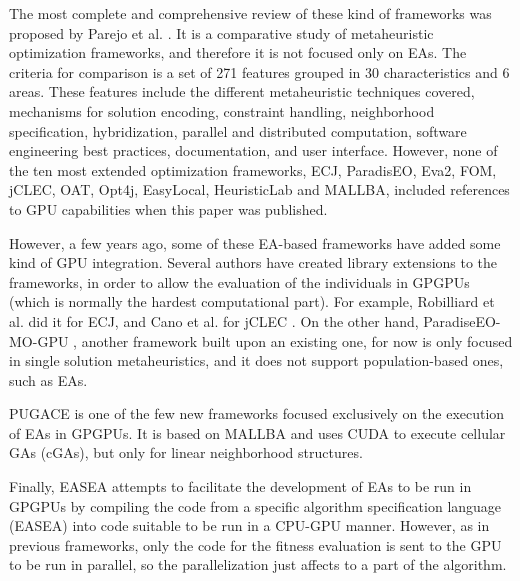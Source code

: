 \documentclass{article}
\begin{document}
The most complete and comprehensive review of these kind of frameworks was proposed by Parejo et al. \cite{springerlink:10.1007/s00500-011-0754-8}. It is a comparative study of metaheuristic optimization frameworks, and therefore it is not focused only on EAs. The criteria for comparison is a set of 271 features grouped in 30 characteristics and 6 areas. These features include the different metaheuristic techniques covered, mechanisms for solution encoding, constraint handling, neighborhood specification, hybridization, parallel and distributed computation, software engineering best practices, documentation, and user interface. However, none of the ten most extended optimization frameworks, ECJ, ParadisEO, Eva2, FOM, jCLEC, OAT, Opt4j, EasyLocal, HeuristicLab and MALLBA, included references to GPU capabilities when this paper was published.

However, a few years ago, some of these EA-based frameworks have added some
kind of GPU integration. Several authors have created library
extensions to the frameworks, in order to allow the evaluation of the
individuals in GPGPUs (which is normally the hardest computational
part). For example, Robilliard et al. \cite{RobilliardECJGPU08} did it
for ECJ, and Cano et al. for jCLEC
\cite{SpeedingTheEvaluationofGPCano:2012}.  
On the other hand, ParadiseEO-MO-GPU \cite{MealbParadiseoGPU13}, another framework built upon an existing one, for now is only focused in single solution metaheuristics, and it does not support population-based ones, such as EAs. 


PUGACE \cite{5586286} is one of the few new frameworks focused exclusively on the execution of EAs in GPGPUs. It is based on MALLBA and uses CUDA to execute cellular GAs (cGAs), but only for linear neighborhood structures. %

Finally, EASEA \cite{Maitre:2009:CGP:1569901.1570089} attempts to facilitate the development of EAs to be run in GPGPUs by compiling the code from a specific algorithm specification language (EASEA) into code suitable to be run in a CPU-GPU manner. 
However, as in previous frameworks, only the code for the fitness
evaluation is sent to the GPU to be run in parallel, so the parallelization just affects to a part of the algorithm. 
\end{document}
